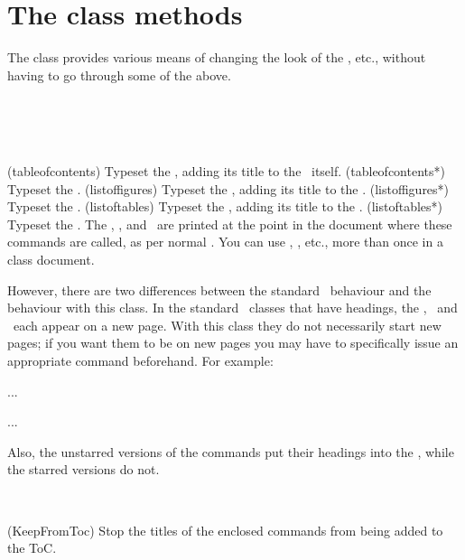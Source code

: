  \section{The class \prtoc{} methods} 
 \label{sec:class-prtoc-methods}

  The class provides various means of changing the look of the \toc, etc.,
without having to go through some of the above. 

\begin{syntax}
\cmd{\tableofcontents} \cmd{\tableofcontents*} \\
\cmd{\listoffigures} \cmd{\listoffigures*} \\
\cmd{\listoftables} \cmd{\listoftables*} \\
\end{syntax}
\glossary(tableofcontents)%
  {}%
  {Typeset the \prtoc, adding its title to the \prtoc\ itself.}
\glossary(tableofcontents*)%
  {}%
  {Typeset the \prtoc.}
\glossary(listoffigures)%
  {}%
  {Typeset the \prlof, adding its title to the \prtoc.}
\glossary(listoffigures*)%
  {}%
  {Typeset the \prlof.}
\glossary(listoftables)%
  {}%
  {Typeset the \prlot, adding its title to the \prtoc.}
\glossary(listoftables*)%
  {}%
  {Typeset the \prlot.}
 The \toc, \lof, and \lot\ are printed at the point in the document where
 these commands are called, as per normal \ltx.
    You can use \cmd{\tableofcontents}, \cmd{\listoffigures}, etc., more
than once in a  class document.


However, there are
 two differences between the standard \ltx\ behaviour and the behaviour
 with this class. In the standard \ltx\ classes
 that have \cmd{\chapter} headings, the \toc, \lof\ and \lot\ 
each appear on a new page. With this class they do not necessarily
 start new pages; if you want them to be on new pages you may have to
 specifically issue an appropriate command beforehand. For example:
 \begin{lcode}
  ...
 \clearpage
 \tableofcontents
 \clearpage
 \listoftables
 ...
 \end{lcode}
Also, the unstarred versions of the commands put their headings 
into the \toc, while the starred versions do not.

\begin{syntax}
   \\
\end{syntax}
\glossary(KeepFromToc)%
  {}%
  {Stop the titles of the enclosed  commands from
   being added to the ToC.}

